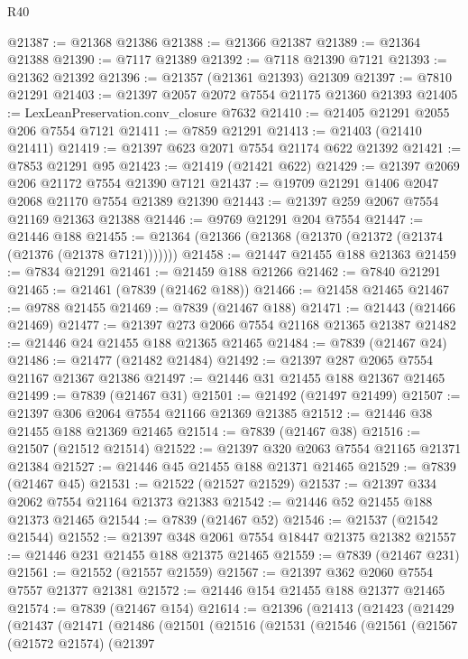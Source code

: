 \begin{lexlean}{R40}
\begin{coremodule}
@21387 := @21368 @21386
@21388 := @21366 @21387
@21389 := @21364 @21388
@21390 := @7117 @21389
@21392 := @7118 @21390 @7121
@21393 := @21362 @21392
@21396 := @21357 (@21361 @21393) @21309
@21397 := @7810 @21291
@21403 := @21397 @2057 @2072 @7554 @21175 @21360 @21393
@21405 := LexLeanPreservation.conv_closure @7632
@21410 := @21405 @21291 @2055 @206 @7554 @7121
@21411 := @7859 @21291
@21413 := @21403 (@21410 @21411)
@21419 := @21397 @623 @2071 @7554 @21174 @622 @21392
@21421 := @7853 @21291 @95
@21423 := @21419 (@21421 @622)
@21429 := @21397 @2069 @206 @21172 @7554 @21390 @7121
@21437 := @19709 @21291 @1406 @2047 @2068 @21170 @7554 @21389 @21390
@21443 := @21397 @259 @2067 @7554 @21169 @21363 @21388
@21446 := @9769 @21291 @204 @7554
@21447 := @21446 @188
@21455 := @21364 (@21366 (@21368 (@21370 (@21372 (@21374 (@21376 (@21378 @7121)))))))
@21458 := @21447 @21455 @188 @21363
@21459 := @7834 @21291
@21461 := @21459 @188 @21266
@21462 := @7840 @21291
@21465 := @21461 (@7839 (@21462 @188))
@21466 := @21458 @21465
@21467 := @9788 @21455
@21469 := @7839 (@21467 @188)
@21471 := @21443 (@21466 @21469)
@21477 := @21397 @273 @2066 @7554 @21168 @21365 @21387
@21482 := @21446 @24 @21455 @188 @21365 @21465
@21484 := @7839 (@21467 @24)
@21486 := @21477 (@21482 @21484)
@21492 := @21397 @287 @2065 @7554 @21167 @21367 @21386
@21497 := @21446 @31 @21455 @188 @21367 @21465
@21499 := @7839 (@21467 @31)
@21501 := @21492 (@21497 @21499)
@21507 := @21397 @306 @2064 @7554 @21166 @21369 @21385
@21512 := @21446 @38 @21455 @188 @21369 @21465
@21514 := @7839 (@21467 @38)
@21516 := @21507 (@21512 @21514)
@21522 := @21397 @320 @2063 @7554 @21165 @21371 @21384
@21527 := @21446 @45 @21455 @188 @21371 @21465
@21529 := @7839 (@21467 @45)
@21531 := @21522 (@21527 @21529)
@21537 := @21397 @334 @2062 @7554 @21164 @21373 @21383
@21542 := @21446 @52 @21455 @188 @21373 @21465
@21544 := @7839 (@21467 @52)
@21546 := @21537 (@21542 @21544)
@21552 := @21397 @348 @2061 @7554 @18447 @21375 @21382
@21557 := @21446 @231 @21455 @188 @21375 @21465
@21559 := @7839 (@21467 @231)
@21561 := @21552 (@21557 @21559)
@21567 := @21397 @362 @2060 @7554 @7557 @21377 @21381
@21572 := @21446 @154 @21455 @188 @21377 @21465
@21574 := @7839 (@21467 @154)
@21614 := @21396
    (@21413
      (@21423
        (@21429
          (@21437
            (@21471
              (@21486
                (@21501
                  (@21516
                    (@21531
                      (@21546
                        (@21561
                          (@21567
                            (@21572 @21574)
                            (@21397

\end{coremodule}
\end{lexlean}
